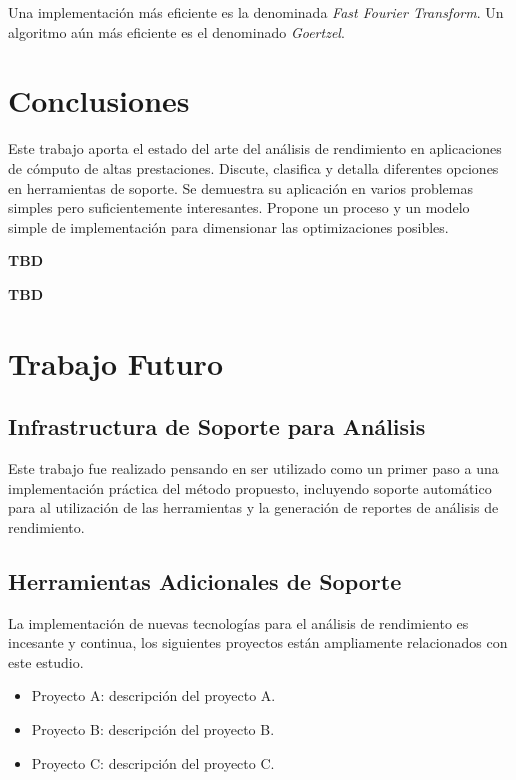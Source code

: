 \documentclass[a4paper]{report}
\begin{document}
Una implementaci\'on m\'as eficiente es la denominada {\it Fast Fourier Transform}.
Un algoritmo a\'un m\'as eficiente es el denominado {\it Goertzel}.

\chapter{Conclusiones}

Este trabajo aporta el estado del arte del an\'alisis de rendimiento en
aplicaciones de c\'omputo de altas prestaciones. Discute, clasifica y detalla
diferentes opciones en herramientas de soporte. Se demuestra su aplicaci\'on
en varios problemas simples pero suficientemente interesantes. Propone un
proceso y un modelo simple de implementaci\'on para dimensionar las
optimizaciones posibles.

\bigskip

{\bf TBD}

\bigskip

{\bf TBD}

\chapter{Trabajo Futuro}

\section{Infrastructura de Soporte para An\'alisis}

Este trabajo fue realizado pensando en ser utilizado como un primer paso
a una implementaci\'on pr\'actica del m\'etodo propuesto, incluyendo soporte
autom\'atico para al utilizaci\'on de las herramientas y la generaci\'on de
reportes de an\'alisis de rendimiento.

\section{Herramientas Adicionales de Soporte}

La implementaci\'on de nuevas tecnolog\'ias para el an\'alisis de rendimiento
es incesante y continua, los siguientes proyectos est\'an ampliamente
relacionados con este estudio.

\begin{itemize}
\item Proyecto A: descripci\'on del proyecto A.
\item Proyecto B: descripci\'on del proyecto B.
\item Proyecto C: descripci\'on del proyecto C.
\end{itemize}
\end{document}
